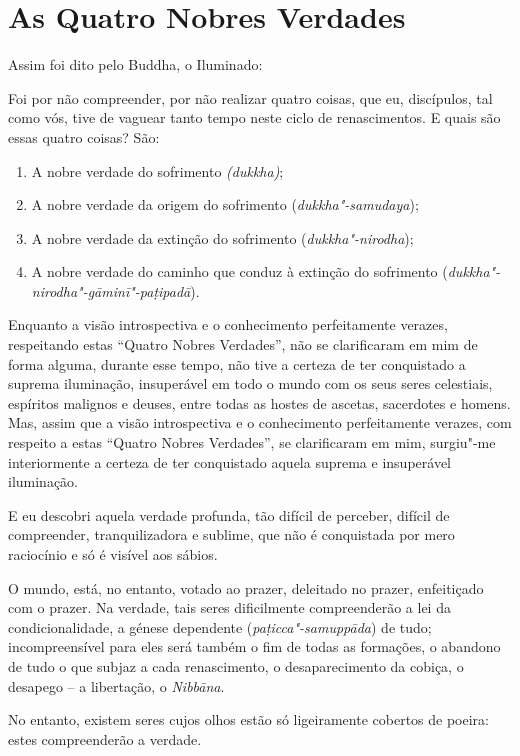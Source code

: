 \chapter{As Quatro Nobres Verdades}

Assim foi dito pelo Buddha, o Iluminado:

Foi por não compreender, por não realizar quatro coisas, que eu, discípulos, tal
como vós, tive de vaguear tanto tempo neste ciclo de renascimentos. E quais são
essas quatro coisas? São:

\begin{enumerate}
  \item A nobre verdade do sofrimento \emph{(dukkha)};

  \item A nobre verdade da origem do sofrimento (\emph{dukkha"-samudaya});

  \item A nobre verdade da extinção do sofrimento (\emph{dukkha"-nirodha});

  \item A nobre verdade do caminho que conduz à extinção do sofrimento (\emph{dukkha"-nirodha"-gāminī"-paṭipadā}).
\end{enumerate}


Enquanto a visão introspectiva e o conhecimento perfeitamente verazes,
respeitando estas “Quatro Nobres Verdades”, não se clarificaram em mim de
forma alguma, durante esse tempo, não tive a certeza de ter conquistado a
suprema iluminação, insuperável em todo o mundo com os seus seres celestiais,
espíritos malignos e deuses, entre todas as hostes de ascetas, sacerdotes e
homens. Mas, assim que a visão introspectiva e o conhecimento perfeitamente
verazes, com respeito a estas “Quatro Nobres Verdades”, se clarificaram em
mim, surgiu"-me interiormente a certeza de ter conquistado aquela suprema e
insuperável iluminação.


E eu descobri aquela verdade profunda, tão difícil de perceber, difícil de
compreender, tranquilizadora e sublime, que não é conquistada por mero
raciocínio e só é visível aos sábios.


O mundo, está, no entanto, votado ao prazer, deleitado no prazer, enfeitiçado
com o prazer. Na verdade, tais seres dificilmente compreenderão a lei da
condicionalidade, a génese dependente (\emph{paṭicca"-samuppāda}) de tudo;
incompreensível para eles será também o fim de todas as formações, o abandono de
tudo o que subjaz a cada renascimento, o desaparecimento da cobiça, o desapego
-- a libertação, o \emph{Nibbāna}.

No entanto, existem seres cujos olhos estão só ligeiramente cobertos de poeira:
estes compreenderão a verdade.

